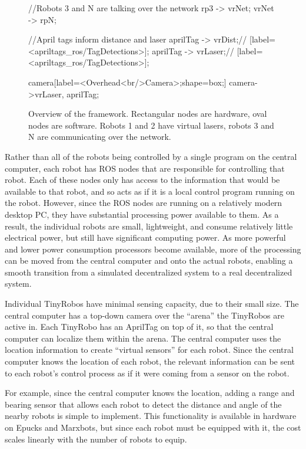 \documentclass[]{article}
\begin{document}
\begin{figure}
{{		//Robots 3 and N are talking over the network
		rp3 -> vrNet;
		vrNet -> rpN;
					
		//April tags inform distance and laser
		aprilTag -> vrDist;// [label=<apriltags\string_ros/TagDetections>];	
		aprilTag -> vrLaser;// [label=<apriltags\string_ros/TagDetections>];
		
				
	}
	
	camera[label=<Overhead<br/>Camera>;shape=box;]
	camera->{vrLaser, aprilTag};	
		 
	}
	\caption{Overview of the framework. Rectangular nodes are hardware, oval nodes are software. Robots 1 and 2 have virtual lasers, robots 3 and N are communicating over the network.}
\end{figure}

Rather than all of the robots being controlled by a single program on the central computer, each robot has ROS nodes that are responsible for controlling that robot. 
Each of these nodes only has access to the information that would be available to that robot, and so acts as if it is a local control program running on the robot.
However, since the ROS nodes are running on a relatively modern desktop PC, they have substantial processing power available to them. 
As a result, the individual robots are small, lightweight, and consume relatively little electrical power, but still have significant computing power. 
As more powerful and lower power consumption processors become available, more of the processing can be moved from the central computer and onto the actual robots, enabling a smooth transition from a simulated decentralized system to a real decentralized system. 

Individual TinyRobos have minimal sensing capacity, due to their small size. 
The central computer has a top-down camera over the ``arena'' the TinyRobos are active in. 
Each TinyRobo has an AprilTag \cite{olson2011tags} on top of it, so that the central computer can localize them within the arena. 
The central computer uses the location information to create ``virtual sensors'' for each robot. 
Since the central computer knows the location of each robot, the relevant information can be sent to each robot's control process as if it were coming from a sensor on the robot. 

For example, since the central computer knows the location, adding a range and bearing sensor that allows each robot to detect the distance and angle of the nearby robots is simple to implement. 
This functionality is available in hardware on Epucks and Marxbots, but since each robot must be equipped with it, the cost scales linearly with the number of robots to equip.  
\end{document}
